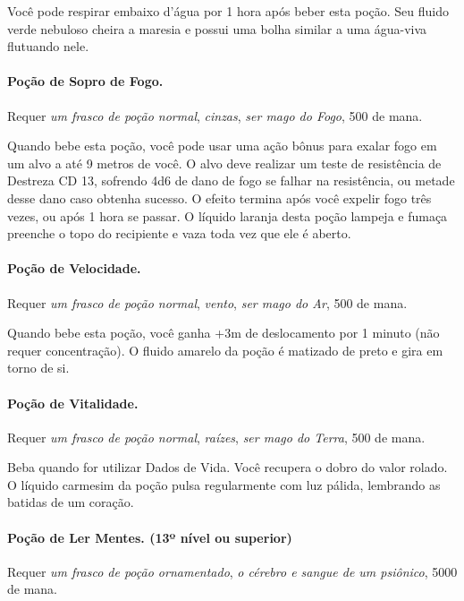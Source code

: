 \begin{multicols}{2}
Você pode respirar embaixo d'água por 1 hora após beber esta poção. Seu fluido
verde nebuloso cheira a maresia e possui uma bolha similar a uma água-viva
flutuando nele.

\paragraph{Poção de Sopro de Fogo.}%

Requer \textit{um frasco de poção normal}, \textit{cinzas}, \textit{ser mago do
Fogo}, 500 de mana.

Quando bebe esta poção, você pode usar uma ação bônus para exalar fogo em um
alvo a até 9 metros de você. O alvo deve realizar um teste de resistência de
Destreza CD 13, sofrendo 4d6 de dano de fogo se falhar na resistência, ou metade
desse dano caso obtenha sucesso. O efeito termina após você expelir fogo três
vezes, ou após 1 hora se passar. O líquido laranja desta poção lampeja e fumaça
preenche o topo do recipiente e vaza toda vez que ele é aberto.

\paragraph{Poção de Velocidade.}%

Requer \textit{um frasco de poção normal}, \textit{vento}, \textit{ser mago do
Ar}, 500 de mana.

Quando bebe esta poção, você ganha +3m de deslocamento por 1 minuto (não requer
concentração). O fluido amarelo da poção é matizado de preto e gira em torno de
si.

\paragraph{Poção de Vitalidade.}%

Requer \textit{um frasco de poção normal}, \textit{raízes}, \textit{ser mago do
Terra}, 500 de mana.

Beba quando for utilizar Dados de Vida. Você recupera o dobro do valor rolado.
O líquido carmesim da poção pulsa regularmente com luz pálida, lembrando as
batidas de um coração.

\paragraph{Poção de Ler Mentes. (13º nível ou superior)}

Requer \textit{um frasco de poção ornamentado}, \textit{o cérebro e sangue de um
psiônico}, 5000 de mana.


\end{multicols}
